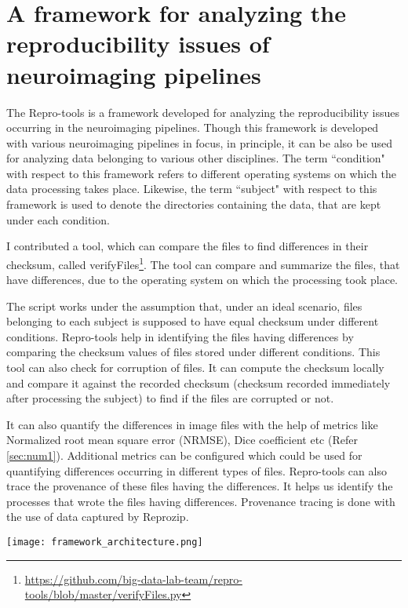 \chapter{A framework for analyzing the reproducibility issues of neuroimaging pipelines}\label{framework}
The Repro-tools is a framework developed for analyzing the reproducibility issues occurring in the neuroimaging pipelines. Though this framework is developed with various neuroimaging pipelines in focus, in principle, it can be also be used for analyzing data belonging to various other disciplines. The term ``condition" with respect to this framework refers to different operating systems on which the data processing takes place. Likewise, the term ``subject" with respect to this framework is used to denote the directories containing the data, that are kept under each condition. 

I contributed a tool, which can compare the files to find differences in their checksum, called verifyFiles\footnote{\url{https://github.com/big-data-lab-team/repro-tools/blob/master/verifyFiles.py}}. The tool can compare and summarize the files, that have differences, due to the operating system on which the processing took place.

The script works under the assumption that, under an ideal scenario, files belonging to each subject is supposed to have equal checksum under different conditions. Repro-tools help in identifying the files having differences by comparing the checksum values of files stored under different conditions. This tool can also check for corruption of files. It can compute the checksum locally and compare it against the recorded checksum (checksum recorded immediately after processing the subject) to find if the files are corrupted or not.

It can also quantify the differences in image files with the help of metrics like Normalized root mean square error (NRMSE), Dice coefficient etc (Refer \ref{sec:num1}). Additional metrics can be configured which could be used for quantifying differences occurring in different types of files. Repro-tools can also trace the provenance of these files having the differences. It helps us identify the processes that wrote the files having differences. Provenance tracing is done with the use of data captured by Reprozip.


\begin{center}
\texttt{[image: framework\_architecture.png]}
\label{fig:framework_architecture}
\end{center}
\vskip 0.2in

